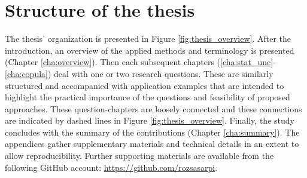 
\section{Structure of the thesis}
\label{sec:organization}

The thesis' organization is presented in Figure \ref{fig:thesis_overview}.
After the introduction, an overview of the applied methods and terminology is presented (Chapter \ref{cha:overview}). Then each subsequent chapters (\ref{cha:stat_unc}-\ref{cha:copula}) deal with one or two research questions. These are similarly structured and accompanied with application examples that are intended to highlight the practical importance of the questions and feasibility of proposed approaches. These question-chapters are loosely connected and these connections are indicated by dashed lines in Figure \ref{fig:thesis_overview}. Finally, the study concludes with the summary of the contributions (Chapter \ref{cha:summary}). The appendices gather supplementary materials and technical details in an extent to allow reproducibility. Further supporting materials are available from the following GitHub account: \url{https://github.com/rozsasarpi}.

